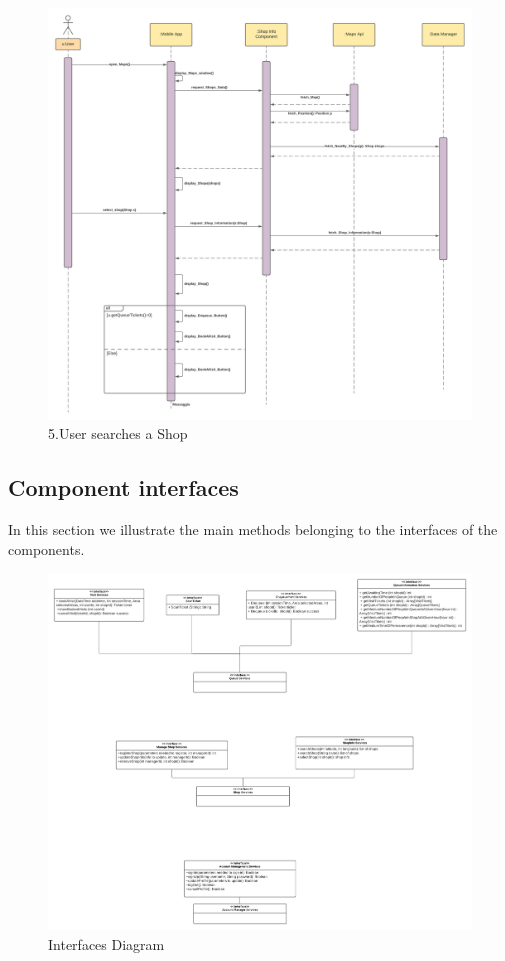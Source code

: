 \begin{figure}[h!]
    \centering
    \includegraphics[width=1\textwidth]{Images/runtimeViewDD/RunTimeViewUserSearchAShop.png}
    \caption{\label{fig:RunTimeViewSearchesAShop}{5.User searches a Shop}}
\end{figure}

\FloatBarrier

\subsection{Component interfaces}
\label{subsect:componentinterfaces}

In this section we illustrate the main methods belonging to the interfaces of the components.

\begin{figure}[h!]
    \centering
    \includegraphics[width=1\textwidth]{Images/InterfacesDiagram.png}
    \caption{\label{fig:InterfacesDiagram}{Interfaces Diagram}}
\end{figure}

